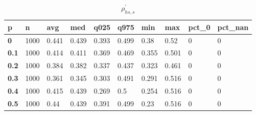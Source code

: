 \begin{table}[h]
 \centering 
\footnotesize
\caption{$\rho_{hs,s}^\prime $}
\label{tab:alphahss}
\begin{tabular}[h]{|l|l|l|l|l|l|l|l|l|l|
    } \hline
\textbf{ p} & \textbf{ n} & \textbf{ avg} & \textbf{ med} & \textbf{ q025} & \textbf{ q975} & \textbf{ min} & \textbf{ max} & \textbf{ pct\_0} & \textbf{ pct\_nan}
    \\ \hline
  \textbf{  0} & 1000 & 0.441 & 0.439 & 0.393 & 0.499 &  0.38 &  0.52 & 0 & 0
    \\ \hline
  \textbf{0.1} & 1000 & 0.414 & 0.411 & 0.369 & 0.469 & 0.355 & 0.501 & 0 & 0
    \\ \hline
  \textbf{0.2} & 1000 & 0.384 & 0.382 & 0.337 & 0.437 & 0.323 & 0.461 & 0 & 0
    \\ \hline
  \textbf{0.3} & 1000 & 0.361 & 0.345 & 0.303 & 0.491 & 0.291 & 0.516 & 0 & 0
    \\ \hline
  \textbf{0.4} & 1000 & 0.415 & 0.439 & 0.269 &   0.5 & 0.254 & 0.516 & 0 & 0
    \\ \hline
  \textbf{0.5} & 1000 &  0.44 & 0.439 & 0.391 & 0.499 &  0.23 & 0.516 & 0 & 0
    \\ \hline
 \end{tabular}
 \end{table}
